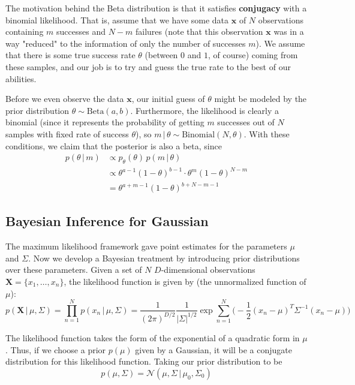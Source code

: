 \documentclass{article}
\begin{document}
    The motivation behind the Beta distribution is that it satisfies \textbf{conjugacy} with a binomial likelihood. That is, assume that we have some data $\mathbf{x}$ of $N$ observations containing $m$ successes and $N-m$ failures (note that this observation $\mathbf{x}$ was in a way "reduced" to the information of only the number of successes $m$). We assume that there is some true success rate $\theta$ (between $0$ and $1$, of course) coming from these samples, and our job is to try and guess the true rate to the best of our abilities.

    Before we even observe the data $\mathbf{x}$, our initial guess of $\theta$ might be modeled by the prior distribution $\theta \sim \text{Beta}(a, b)$. Furthermore, the likelihood is clearly a binomial (since it represents the probability of getting $m$ successes out of $N$ samples with fixed rate of success $\theta$), so $m\,|\,\theta \sim \text{Binomial}(N, \theta)$. With these conditions, we claim that the posterior is also a beta, since
    \begin{align*}
      p(\theta\,|\, m) & \propto p_\theta (\theta) \, p(m\,|\,\theta) \\
      & \propto \theta^{a - 1} (1 - \theta)^{b - 1} \cdot \theta^m (1 - \theta)^{N - m} \\
      & = \theta^{a + m - 1} (1 - \theta)^{b + N - m - 1}
    \end{align*}

  \subsection{Bayesian Inference for Gaussian}

    The maximum likelihood framework gave point estimates for the parameters $\mu$ and $\Sigma$. Now we develop a Bayesian treatment by introducing prior distributions over these parameters. Given a set of $N$ $D$-dimensional observations $\mathbf{X} = \{x_1, \ldots, x_n\}$, the likelihood function is given by (the unnormalized function of $\mu$):
    \begin{equation}
      p(\mathbf{X}\,|\,\mu, \Sigma) = \prod_{n=1}^N p(x_n\,|\,\mu, \Sigma) = \frac{1}{(2\pi)^{D/2}} \frac{1}{|\Sigma|^{1/2}} \exp \sum_{n=1}^N \bigg(-\frac{1}{2} (x_n - \mu)^T \Sigma^{-1} (x_n - \mu)\bigg)
    \end{equation}

    The likelihood function takes the form of the exponential of a quadratic form in $\mu$. Thus, if we choose a prior $p(\mu)$ given by a Gaussian, it will be a conjugate distribution for this likelihood function. Taking our prior distribution to be
    \begin{equation}
      p(\mu, \Sigma) = \mathcal{N}(\mu, \Sigma\,|\,\mu_0, \Sigma_0)
    \end{equation}
\end{document}

